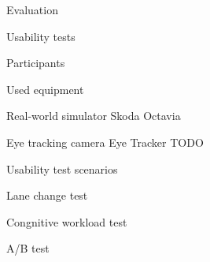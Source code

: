 \chap Evaluation

\sec Usability tests

\secc Participants


\secc Used equipment

Real-world simulator Skoda Octavia

Eye tracking camera Eye Tracker TODO

\sec Usability test scenarios

\secc Lane change test

\secc Congnitive workload test

\secc A/B test




